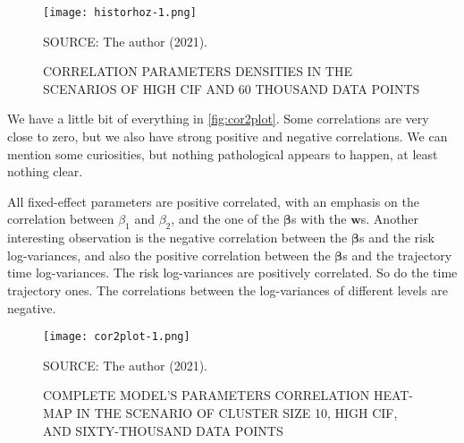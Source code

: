 \begin{figure}[H]
 \setlength{\abovecaptionskip}{.0001pt}
 \caption{CORRELATION PARAMETERS DENSITIES IN THE SCENARIOS OF HIGH CIF
          AND 60 THOUSAND DATA POINTS}
 \vspace{0.2cm}\centering
 \texttt{[image: historhoz-1.png]}\\
 \begin{footnotesize}
  SOURCE: The author (2021).
 \end{footnotesize}
 \label{fig:historhoz}
\end{figure}

We have a little bit of everything in \autoref{fig:cor2plot}. Some
correlations are very close to zero, but we also have strong positive
and negative correlations. We can mention some curiosities, but nothing
pathological appears to happen, at least nothing clear.

All fixed-effect parameters are positive correlated, with an emphasis on
the correlation between \(\beta_{1}\) and \(\beta_{2}\), and the one of
the \(\bm{\beta}\)s with the \(\bm{w}\)s. Another interesting
observation is the negative correlation between the \(\bm{\beta}\)s and
the risk log-variances, and also the positive correlation between the
\(\bm{\beta}\)s and the trajectory time log-variances. The risk
log-variances are positively correlated. So do the time trajectory
ones. The correlations between the log-variances of different levels are
negative.

\begin{figure}[H]
 \setlength{\abovecaptionskip}{.0001pt}
 \caption{COMPLETE MODEL'S PARAMETERS CORRELATION HEAT-MAP IN THE
          SCENARIO OF CLUSTER SIZE 10, HIGH CIF, AND SIXTY-THOUSAND DATA
          POINTS}
 \centering
 \texttt{[image: cor2plot-1.png]}\\
 \vspace{-0.2cm}
 \begin{footnotesize}
  SOURCE: The author (2021).
 \end{footnotesize}
 \label{fig:cor2plot}
\end{figure}

